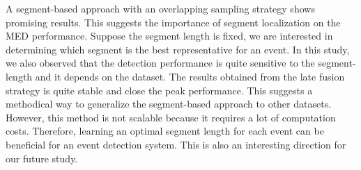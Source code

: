 A segment-based approach with an overlapping sampling strategy shows promising results. This suggests the importance of segment localization on the MED performance. Suppose the segment length is fixed, we are interested in determining which segment is the best representative for an event. In this study, we also observed that the detection performance is quite sensitive to the segment-length and it depends on the dataset. The results obtained from the late fusion strategy is quite stable and close the peak performance. This suggests a methodical way to generalize the segment-based approach to other datasets. However, this method is not scalable because it requires a lot of computation costs. Therefore, learning an optimal segment length for each event can be beneficial for an event detection system. This is also an interesting direction for our future study.

